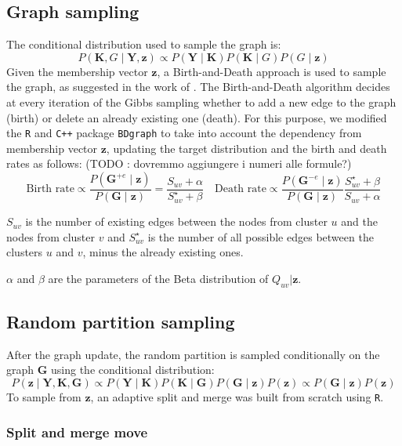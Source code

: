 \subsection{Graph sampling}
The conditional distribution used to sample the graph is:
\[
    P(\bm{K},G \mid \bm{Y},\bm{z}) \propto P(\bm{Y} \mid \bm{K})P(\bm{K} \mid {G}) P(G \mid \bm{z})
\]
Given the membership vector $\bm{z}$, a Birth-and-Death approach is used to sample the graph, as suggested in the work of \textcite{mohammadiBayesianStructureLearning2015a}.
The Birth-and-Death algorithm decides at every iteration of the Gibbs sampling whether to add a new edge to the graph (birth) or delete an already existing one (death).
For this purpose, we modified the \texttt{R} and \texttt{C++} package \texttt{BDgraph} to take into account the dependency from membership vector $\bm{z}$, updating the target distribution and the birth and death rates as follows: (TODO : dovremmo aggiungere i numeri alle formule?)
\[
\text{Birth rate} \propto \frac{P(\bm{G}^{+ e}\mid \bm{z})}{P(\bm{G}\mid \bm{z})} = \frac{S_{uv} + \alpha}{S^{\star}_{uv} + \beta}
\quad
\text{Death rate} \propto \frac{P(\bm{G}^{- e}\mid \bm{z})}{P(\bm{G}\mid \bm{z})} \frac{S^{\star}_{uv} + \beta}{S_{uv} + \alpha}
\]

$S_{uv}$ is the number of existing edges between the nodes from cluster $u$ and the nodes from cluster $v$ and $S^{\star}_{uv}$ is the number of all possible edges between the clusters $u$ and $v$, minus the already existing ones. 

$\alpha$ and $\beta$ are the parameters of the Beta distribution of $Q_{uv}\vert \bm{z}$.

\subsection{Random partition sampling}
After the graph update, the random partition is sampled conditionally on the graph $\bm{G}$ using the conditional distribution:
\begin{equation*}
    P(\bm{z} \mid \bm{Y},\bm{K},\bm{G}) \propto P(\bm{Y} \mid \bm{K})P(\bm{K} \mid \bm{G})P(\bm{G} \mid \bm{z})P(\bm{z}) \propto P(\bm{G} \mid \bm{z})P(\bm{z})
\end{equation*}
To sample from $\bm{z}$, an adaptive split and merge was built from scratch using \texttt{R}.

\subsubsection{Split and merge move}

